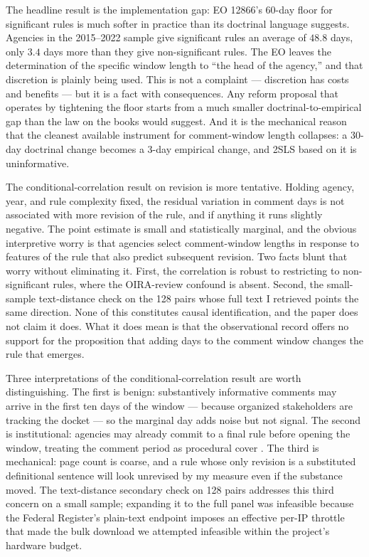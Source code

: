 \documentclass[12pt]{article}
\begin{document}
The headline result is the implementation gap: EO 12866's 60-day floor for significant rules is much softer in practice than its doctrinal language suggests. Agencies in the 2015--2022 sample give significant rules an average of $48.8$ days, only $3.4$ days more than they give non-significant rules. The EO leaves the determination of the specific window length to ``the head of the agency,'' and that discretion is plainly being used. This is not a complaint --- discretion has costs and benefits --- but it is a fact with consequences. Any reform proposal that operates by tightening the floor starts from a much smaller doctrinal-to-empirical gap than the law on the books would suggest. And it is the mechanical reason that the cleanest available instrument for comment-window length collapses: a 30-day doctrinal change becomes a 3-day empirical change, and 2SLS based on it is uninformative.

The conditional-correlation result on revision is more tentative. Holding agency, year, and rule complexity fixed, the residual variation in comment days is not associated with more revision of the rule, and if anything it runs slightly negative. The point estimate is small and statistically marginal, and the obvious interpretive worry is that agencies select comment-window lengths in response to features of the rule that also predict subsequent revision. Two facts blunt that worry without eliminating it. First, the correlation is robust to restricting to non-significant rules, where the OIRA-review confound is absent. Second, the small-sample text-distance check on the 128 pairs whose full text I retrieved points the same direction. None of this constitutes causal identification, and the paper does not claim it does. What it does mean is that the observational record offers no support for the proposition that adding days to the comment window changes the rule that emerges.

Three interpretations of the conditional-correlation result are worth distinguishing. The first is benign: substantively informative comments may arrive in the first ten days of the window --- because organized stakeholders are tracking the docket --- so the marginal day adds noise but not signal. The second is institutional: agencies may already commit to a final rule before opening the window, treating the comment period as procedural cover \citep{cuellar2005rethinking,nou2018subdelegating}. The third is mechanical: page count is coarse, and a rule whose only revision is a substituted definitional sentence will look unrevised by my measure even if the substance moved. The text-distance secondary check on 128 pairs addresses this third concern on a small sample; expanding it to the full panel was infeasible because the Federal Register's plain-text endpoint imposes an effective per-IP throttle that made the bulk download we attempted infeasible within the project's hardware budget.
\end{document}

